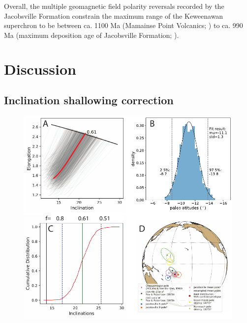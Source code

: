 \documentclass[draft]{agujournal2019}
\begin{document}
Overall, the multiple geomagnetic field polarity reversals recorded by the Jacobsville Formation constrain the maximum range of the Keweenawan superchron \cite{Driscoll2016b} to be between ca. 1100 Ma (Mamainse Point Volcanics; \cite{Swanson-Hysell2019a}) to ca. 990 Ma (maximum deposition age of Jacobsville Formation; \cite{Hodgin2022a}). 

\section*{Discussion}

\subsection*{Inclination shallowing correction}

\begin{figure}[H!]
\centering
\includegraphics[width=\textwidth]{EI_results.pdf}

\end{figure}
\end{document}
